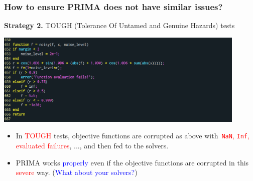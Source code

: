 \documentclass[slidestop,mathserif,xcolor=dvipsnames]{beamer}
\newcommand{\blue}[1]{\textcolor{blue}{#1}}
\newcommand{\red}[1]{\textcolor{red}{#1}}
\begin{document}
\begin{frame}
    \frametitle{How to ensure PRIMA does not have similar issues? }

    \textbf{Strategy 2.} TOUGH (Tolerance Of Untamed and Genuine Hazards) tests

    \begin{center}
        \includegraphics[width=0.9\textwidth]{tough.png}
    \end{center}

    \begin{itemize}
        \item In \red{TOUGH} tests, objective functions are corrupted as above with~\red{\texttt{NaN},
            \texttt{Inf}, evaluated failures}, ..., and then fed to the solvers.
            \vspace{0.5ex}
        \item PRIMA works \blue{properly} even if the objective functions are
            corrupted in this \red{severe} way. (\blue{What about your solvers?})
    \end{itemize}
\end{frame}
\end{document}
